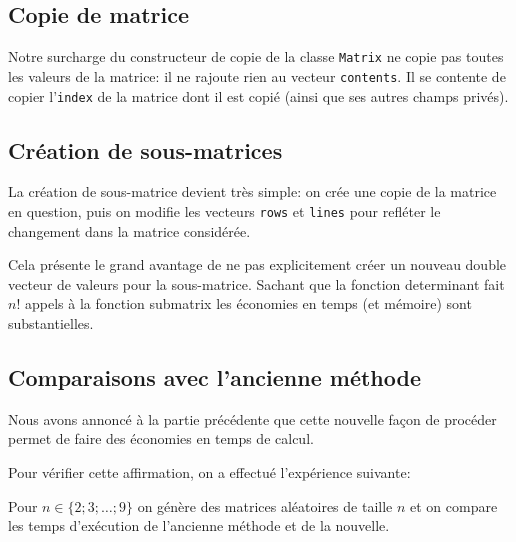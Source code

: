 \documentclass[a4paper,11pt]{article}
\begin{document}
\subsection{Copie de matrice}

Notre surcharge du constructeur de copie de la classe \texttt{Matrix}  ne copie pas toutes les valeurs de la matrice: il ne rajoute rien au vecteur \texttt{contents}. Il se contente de copier l'\texttt{index} de la matrice dont il est copié (ainsi que ses autres champs privés).

\subsection{Création de sous-matrices}

La création de sous-matrice devient très simple: on crée une copie de la matrice en question, puis on modifie les vecteurs \texttt{rows} et \texttt{lines} pour refléter le changement dans la matrice considérée.

Cela présente le grand avantage de ne pas explicitement créer un nouveau double vecteur de valeurs pour la sous-matrice. Sachant que la fonction determinant fait $n!$ appels à la fonction submatrix les économies en temps (et mémoire) sont substantielles.


\subsection{Comparaisons avec l'ancienne méthode}

Nous avons annoncé à la partie précédente que cette nouvelle façon de procéder permet de faire des économies en temps de calcul.

Pour vérifier cette affirmation, on a effectué l'expérience suivante:

Pour $n \in \{2;3;\dots;9\}$ on génère des matrices aléatoires de taille $n$ et on compare les temps d'exécution de l'ancienne méthode et de la nouvelle.
\end{document}
